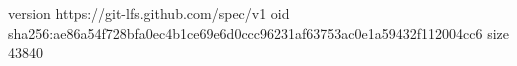 version https://git-lfs.github.com/spec/v1
oid sha256:ae86a54f728bfa0ec4b1ce69e6d0ccc96231af63753ac0e1a59432f112004cc6
size 43840
